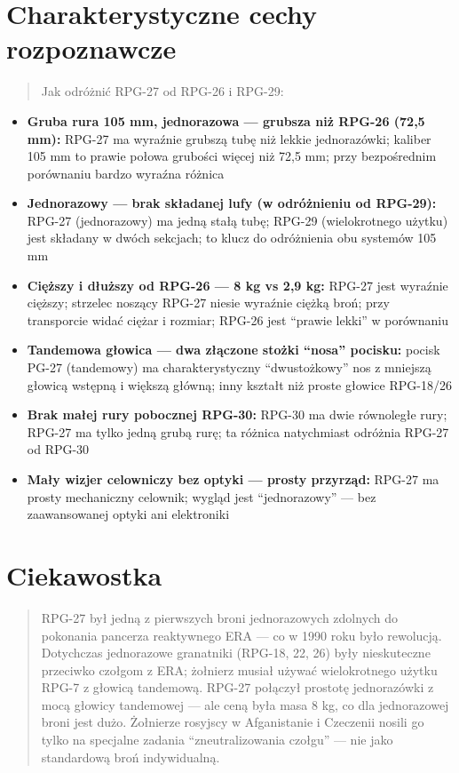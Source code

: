 \documentclass[12pt,openany,oneside]{book}
\providecommand{\tightlist}{%
  \setlength{\itemsep}{0pt}\setlength{\parskip}{0pt}}
\begin{document}
\section{Charakterystyczne cechy
rozpoznawcze}\label{charakterystyczne-cechy-rozpoznawcze-72}

\begin{quote}
Jak odróżnić RPG-27 od RPG-26 i RPG-29:
\end{quote}

\begin{itemize}
\tightlist
\item
  \textbf{Gruba rura 105 mm, jednorazowa --- grubsza niż RPG-26 (72,5
  mm):} RPG-27 ma wyraźnie grubszą tubę niż lekkie jednorazówki; kaliber
  105 mm to prawie połowa grubości więcej niż 72,5 mm; przy bezpośrednim
  porównaniu bardzo wyraźna różnica
\item
  \textbf{Jednorazowy --- brak składanej lufy (w odróżnieniu od
  RPG-29):} RPG-27 (jednorazowy) ma jedną stałą tubę; RPG-29
  (wielokrotnego użytku) jest składany w dwóch sekcjach; to klucz do
  odróżnienia obu systemów 105 mm
\item
  \textbf{Cięższy i dłuższy od RPG-26 --- 8 kg vs 2,9 kg:} RPG-27 jest
  wyraźnie cięższy; strzelec noszący RPG-27 niesie wyraźnie ciężką broń;
  przy transporcie widać ciężar i rozmiar; RPG-26 jest ``prawie lekki''
  w porównaniu
\item
  \textbf{Tandemowa głowica --- dwa złączone stożki ``nosa'' pocisku:}
  pocisk PG-27 (tandemowy) ma charakterystyczny ``dwustożkowy'' nos z
  mniejszą głowicą wstępną i większą główną; inny kształt niż proste
  głowice RPG-18/26
\item
  \textbf{Brak małej rury pobocznej RPG-30:} RPG-30 ma dwie równoległe
  rury; RPG-27 ma tylko jedną grubą rurę; ta różnica natychmiast
  odróżnia RPG-27 od RPG-30
\item
  \textbf{Mały wizjer celowniczy bez optyki --- prosty przyrząd:} RPG-27
  ma prosty mechaniczny celownik; wygląd jest ``jednorazowy'' --- bez
  zaawansowanej optyki ani elektroniki
\end{itemize}

\section{Ciekawostka}\label{ciekawostka-72}

\begin{quote}
RPG-27 był jedną z pierwszych broni jednorazowych zdolnych do pokonania
pancerza reaktywnego ERA --- co w 1990 roku było rewolucją. Dotychczas
jednorazowe granatniki (RPG-18, 22, 26) były nieskuteczne przeciwko
czołgom z ERA; żołnierz musiał używać wielokrotnego użytku RPG-7 z
głowicą tandemową. RPG-27 połączył prostotę jednorazówki z mocą głowicy
tandemowej --- ale ceną była masa 8 kg, co dla jednorazowej broni jest
dużo. Żołnierze rosyjscy w Afganistanie i Czeczenii nosili go tylko na
specjalne zadania ``zneutralizowania czołgu'' --- nie jako standardową
broń indywidualną.
\end{quote}
\end{document}
